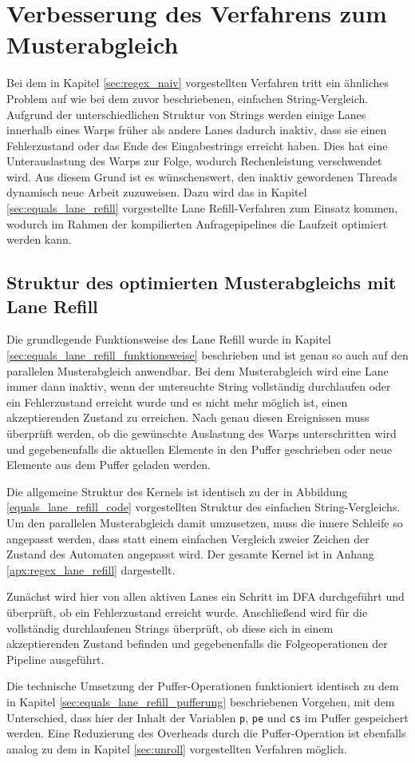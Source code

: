 \chapter{Verbesserung des Verfahrens zum Musterabgleich}

Bei dem in Kapitel \ref{sec:regex_naiv} vorgestellten Verfahren tritt ein ähnliches Problem auf wie bei dem zuvor beschriebenen, einfachen String-Vergleich.
Aufgrund der unterschiedlichen Struktur von Strings werden einige Lanes innerhalb eines Warps früher als andere Lanes dadurch inaktiv, dass sie einen Fehlerzustand oder das Ende des Eingabestrings erreicht haben.
Dies hat eine Unterauslastung des Warps zur Folge, wodurch Rechenleistung verschwendet wird.
Aus diesem Grund ist es wünschenswert, den inaktiv gewordenen Threads dynamisch neue Arbeit zuzuweisen.
Dazu wird das in Kapitel \ref{sec:equals_lane_refill} vorgestellte Lane Refill-Verfahren zum Einsatz kommen, wodurch im Rahmen der kompilierten Anfragepipelines die Laufzeit optimiert werden kann.


\section{Struktur des optimierten Musterabgleichs mit Lane Refill}

Die grundlegende Funktionsweise des Lane Refill wurde in Kapitel \ref{sec:equals_lane_refill_funktionsweise} beschrieben und ist genau so auch auf den parallelen Musterabgleich anwendbar.
Bei dem Musterabgleich wird eine Lane immer dann inaktiv, wenn der untersuchte String vollständig durchlaufen oder ein Fehlerzustand erreicht wurde und es nicht mehr möglich ist, einen akzeptierenden Zustand zu erreichen.
Nach genau diesen Ereignissen muss überprüft werden, ob die gewünschte Auslastung des Warps unterschritten wird und gegebenenfalls die aktuellen Elemente in den Puffer geschrieben oder neue Elemente aus dem Puffer geladen werden.

Die allgemeine Struktur des Kernels ist identisch zu der in Abbildung \ref{equals_lane_refill_code} vorgestellten Struktur des einfachen String-Vergleichs.
Um den parallelen Musterabgleich damit umzusetzen, muss die innere Schleife so angepasst werden, dass statt einem einfachen Vergleich zweier Zeichen der Zustand des Automaten angepasst wird.
Der gesamte Kernel ist in Anhang \ref{apx:regex_lane_refill} dargestellt.

Zunächst wird hier von allen aktiven Lanes ein Schritt im DFA durchgeführt und überprüft, ob ein Fehlerzustand erreicht wurde.
Anschließend wird für die vollständig durchlaufenen Strings überprüft, ob diese sich in einem akzeptierenden Zustand befinden und gegebenenfalls die Folgeoperationen der Pipeline ausgeführt.

Die technische Umsetzung der Puffer-Operationen funktioniert identisch zu dem in Kapitel \ref{sec:equals_lane_refill_pufferung} beschriebenen Vorgehen, mit dem Unterschied, dass hier der Inhalt der Variablen \texttt{p}, \texttt{pe} und \texttt{cs} im Puffer gespeichert werden.
Eine Reduzierung des Overheads durch die Puffer-Operation ist ebenfalls analog zu dem in Kapitel \ref{sec:unroll} vorgestellten Verfahren möglich.